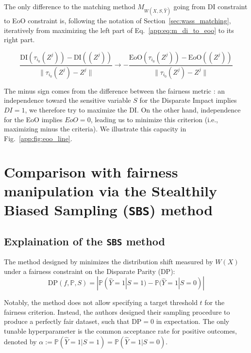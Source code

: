 \documentclass[runningheads, orivec]{llncs}
\newcommand{\ec}[1]{\textcolor{darkpink}{#1}}
\begin{document}
The only difference to the matching method $M_{W(X,S,\widehat{Y})}$ going from DI constraint to EoO constraint is, following the notation of Section~\ref{sec:wass_matching}, iteratively from maximizing the left part of Eq.~\ref{app:eq:m_di_to_eoo} to its right part.

\begin{equation} \label{app:eq:m_di_to_eoo}
 \frac{\text{DI}(\tau_{i_0}(Z^j)) - \text{DI}((Z^j))}{\|\tau_{i_0}(Z^j) - Z^j\|} \to - \frac{\text{EoO}(\tau_{i_0}(Z^j)) - \text{EoO}((Z^j))}{\|\tau_{i_0}(Z^j) - Z^j\|}
\end{equation}

The minus sign comes from the difference between the fairness metric : an independence toward the sensitive variable $S$ for the Disparate Impact implies $DI=1$, we therefore try to maximize the DI. On the other hand, independence for the EoO implies $EoO=0$, leading us to minimize this criterion (i.e., maximizing minus the criteria). We illustrate this capacity in Fig.~\ref{app:fig:eoo_line}.


\section{Comparison with fairness manipulation via the Stealthily Biased Sampling (\texttt{SBS}) method}

\subsection{Explaination of the \texttt{SBS} method} 

The method designed by \cite{fukuchi2020faking} minimizes the distribution shift measured by $W(X)$ under a fairness constraint on the Disparate Parity (DP): 
\[
\text{DP}(f, \mathbb{P}, S) = |\mathbb{P}(\widehat{Y}=1|S=1) - \mathbb{P}(\widehat{Y}=1|S=0)|
\]

Notably, the method does not allow specifying a target threshold $t$ for the fairness criterion. Instead, the authors designed their sampling procedure to produce a perfectly fair dataset, such that $\text{DP} = 0$ in expectation. The only tunable hyperparameter is the common acceptance rate for positive outcomes, denoted by $\alpha:=\mathbb{P}(\widehat{Y}=1|S=1)=\mathbb{P}(\widehat{Y}=1|S=0)$.
\end{document}
